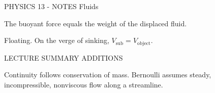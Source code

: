 PHYSICS 13 - NOTES
Fluids

The buoyant force equals the weight of the displaced fluid.

Floating. On the verge of sinking, \(V_{\text{sub}} = V_{\text{object}}\).

LECTURE SUMMARY ADDITIONS

Continuity follows conservation of mass. Bernoulli assumes steady, incompressible, nonviscous flow along a streamline.
